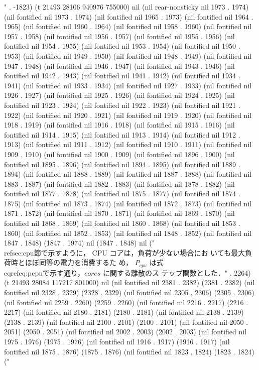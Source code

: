 " . -1823) (t 21493 28106 940976 755000) nil (nil rear-nonsticky nil 1973 . 1974) (nil fontified nil 1973 . 1974) (nil fontified nil 1965 . 1973) (nil fontified nil 1964 . 1965) (nil fontified nil 1960 . 1964) (nil fontified nil 1958 . 1960) (nil fontified nil 1957 . 1958) (nil fontified nil 1956 . 1957) (nil fontified nil 1955 . 1956) (nil fontified nil 1954 . 1955) (nil fontified nil 1953 . 1954) (nil fontified nil 1950 . 1953) (nil fontified nil 1949 . 1950) (nil fontified nil 1948 . 1949) (nil fontified nil 1947 . 1948) (nil fontified nil 1946 . 1947) (nil fontified nil 1943 . 1946) (nil fontified nil 1942 . 1943) (nil fontified nil 1941 . 1942) (nil fontified nil 1934 . 1941) (nil fontified nil 1933 . 1934) (nil fontified nil 1927 . 1933) (nil fontified nil 1926 . 1927) (nil fontified nil 1925 . 1926) (nil fontified nil 1924 . 1925) (nil fontified nil 1923 . 1924) (nil fontified nil 1922 . 1923) (nil fontified nil 1921 . 1922) (nil fontified nil 1920 . 1921) (nil fontified nil 1919 . 1920) (nil fontified nil 1918 . 1919) (nil fontified nil 1916 . 1918) (nil fontified nil 1915 . 1916) (nil fontified nil 1914 . 1915) (nil fontified nil 1913 . 1914) (nil fontified nil 1912 . 1913) (nil fontified nil 1911 . 1912) (nil fontified nil 1910 . 1911) (nil fontified nil 1909 . 1910) (nil fontified nil 1900 . 1909) (nil fontified nil 1896 . 1900) (nil fontified nil 1895 . 1896) (nil fontified nil 1894 . 1895) (nil fontified nil 1889 . 1894) (nil fontified nil 1888 . 1889) (nil fontified nil 1887 . 1888) (nil fontified nil 1883 . 1887) (nil fontified nil 1882 . 1883) (nil fontified nil 1878 . 1882) (nil fontified nil 1877 . 1878) (nil fontified nil 1875 . 1877) (nil fontified nil 1874 . 1875) (nil fontified nil 1873 . 1874) (nil fontified nil 1872 . 1873) (nil fontified nil 1871 . 1872) (nil fontified nil 1870 . 1871) (nil fontified nil 1869 . 1870) (nil fontified nil 1868 . 1869) (nil fontified nil 1860 . 1868) (nil fontified nil 1853 . 1860) (nil fontified nil 1852 . 1853) (nil fontified nil 1848 . 1852) (nil fontified nil 1847 . 1848) (1847 . 1974) nil (1847 . 1848) nil ("~\\ref{sec:cpu}節で示すように， CPU コアは，負荷が少ない場合にお
いても最大負荷時とほぼ同等の電力を消費するた
め， $P_{cpu}$ は式\\eqref{eq:pcpu}で示す通り，$cores$ に関する離散のス
テップ関数とした．" . 2264) (t 21493 28084 117217 801000) nil (nil fontified nil 2381 . 2382) (2381 . 2382) (nil fontified nil 2328 . 2329) (2328 . 2329) (nil fontified nil 2305 . 2306) (2305 . 2306) (nil fontified nil 2259 . 2260) (2259 . 2260) (nil fontified nil 2216 . 2217) (2216 . 2217) (nil fontified nil 2180 . 2181) (2180 . 2181) (nil fontified nil 2138 . 2139) (2138 . 2139) (nil fontified nil 2100 . 2101) (2100 . 2101) (nil fontified nil 2050 . 2051) (2050 . 2051) (nil fontified nil 2002 . 2003) (2002 . 2003) (nil fontified nil 1975 . 1976) (1975 . 1976) (nil fontified nil 1916 . 1917) (1916 . 1917) (nil fontified nil 1875 . 1876) (1875 . 1876) (nil fontified nil 1823 . 1824) (1823 . 1824) ("
